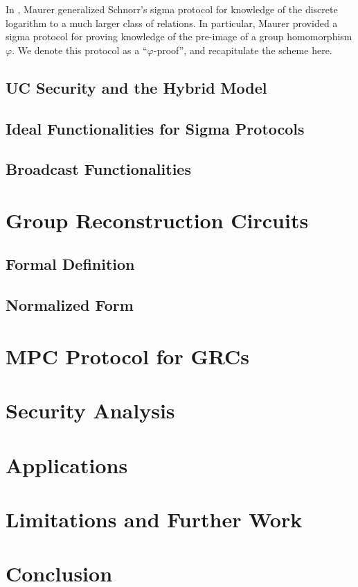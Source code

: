 In \cite{maurer_unifying_2009}, Maurer generalized Schnorr's sigma 
protocol for knowledge of the discrete logarithm \cite{schnorr_efficient_1990} to a much larger class
of relations. In particular, Maurer provided a sigma protocol for
proving knowledge of the pre-image of a group homomorphism $\varphi$.
We denote this protocol as a ``$\varphi$-proof'', and recapitulate the scheme
here.

\subsection{UC Security and the Hybrid Model}

\subsection{Ideal Functionalities for Sigma Protocols}

\subsection{Broadcast Functionalities}

\section{Group Reconstruction Circuits}

\subsection{Formal Definition}

\subsection{Normalized Form}

\section{MPC Protocol for GRCs}

\section{Security Analysis}

\section{Applications}

\section{Limitations and Further Work}

\section{Conclusion}


\small 

